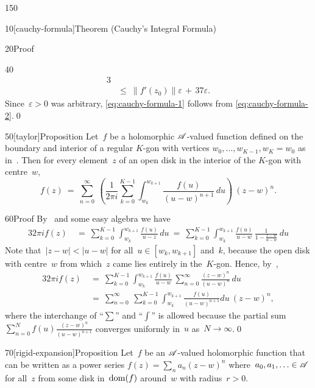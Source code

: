 \begin{parsec}{150}
\begin{point}{10}[cauchy-formula]{Theorem (Cauchy's Integral Formula)}
\begin{point}{20}{Proof}
\begin{point}{40}
\begin{alignat*}{3}
\\
	\ &\leq \ \|f'(z_0)\|\varepsilon\,+\,37\varepsilon.
\end{alignat*}
Since~$\varepsilon>0$ was arbitrary,
 \eqref{eq:cauchy-formula-1}
follows from \eqref{eq:cauchy-formula-2}.\qed
\end{point}
\end{point}
\end{point}
\begin{point}{50}[taylor]{Proposition}%
Let~$f$ be a holomorphic $\mathscr{A}$-valued function
defined on the boundary and interior
of a regular $K$-gon
with vertices $w_0,\dotsc,w_{K-1},w_K=w_0$
as in~.
Then for every element~$z$ of an open disk in the interior of the $K$-gon
with centre~$w$,
\begin{equation*}
f(z)\ = \ 
	\sum_{n=0}^\infty \ 
	\left(\frac{1}{2\pi i}\sum_{k=0}^{K-1}\int_{w_k}^{w_{k+1}} 
	\frac{f(u)}{(u-w)^{n+1}}\,du\right)
\ (z-w)^n.
\end{equation*} 
\begin{point}{60}{Proof}%
By~ and some easy algebra we have
\begin{alignat*}{3}
2\pi if(z)\ &=\  
	\sum_{k=0}^{K-1}\int_{w_k}^{w_{k+1}}
	\frac{f(u)}{u-z}\,du
\ =\ 
\sum_{k=0}^{K-1}\int_{w_k}^{w_{k+1}}
   \frac{f(u)}{u-w}\,\frac{1}{1-\frac{z-w}{u-w}}\,du
\end{alignat*}
Note that~$\left|z-w\right|<\left|u-w\right|$
for all~$u\in [w_k,w_{k+1}]$ and~$k$,
because the open disk with centre~$w$
from which~$z$ came lies entirely in the~$K$-gon.
Hence,
by~\sref{geometric},
\begin{alignat*}{3}
	2\pi if(z) \ &= \ 
\sum_{k=0}^{K-1}\int_{w_k}^{w_{k+1}}
   \frac{f(u)}{u-w}\, \sum_{n=0}^\infty 
\frac{(z-w)^n}{(u-w)^n}
 \,du\\
 \ &= \ 
  \sum_{n=0}^\infty \ 
\sum_{k=0}^{K-1}\int_{w_k}^{w_{k+1}}
  \frac{f(u)}{(u-w)^{n+1}}du \ (z-w)^n,
\end{alignat*}
where the interchange of ``$\sum$'' and ``$\int$''
is allowed
because the partial sum 
$\sum_{n=0}^Nf(u)\frac{(z-w)^n}{(u-w)^{n+1}}$
converges uniformly in~$u$ as~$N\to\infty$.\qed
\end{point}
\end{point}
\begin{point}{70}[rigid-expansion]{Proposition}%
Let~$f$ be an $\mathscr{A}$-valued holomorphic
function
that 
can be written as a power
series $f(z)=\sum_n a_n (z-w)^n$
where~$a_0,a_1,\dotsc\in\mathscr{A}$
for all~$z$ from some disk in~$\operatorname{dom}(f)$ around~$w$
with radius~$r>0$.


\end{point}
\end{parsec}
